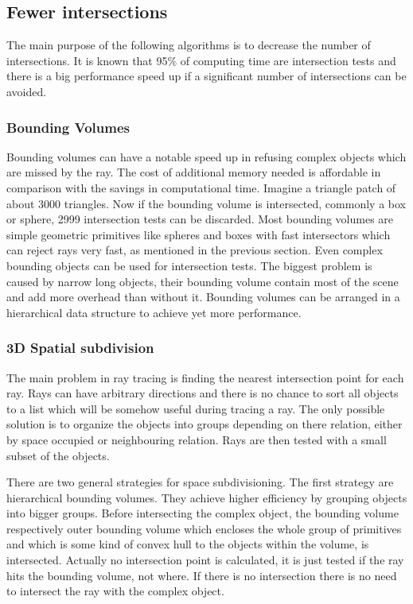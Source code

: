 \documentclass[DIV10, abstracton, openright, footsepline, headsepline, twoside, 9pt,
bigheadings]{scrreprt}
\begin{document}
\subsection{Fewer intersections}
The main purpose of the following algorithms is to decrease the number of
intersections. It is known that 95\% of computing time are intersection tests
and there is a big performance speed up if a significant number of intersections
can be avoided.
\subsubsection{Bounding Volumes}
Bounding volumes can have a notable speed up in refusing complex objects which
are missed by the ray. The cost of additional memory needed is affordable in
comparison with the savings in computational time. Imagine a triangle patch of
about 3000 triangles. Now if the bounding volume is intersected, commonly a box
or sphere, 2999 intersection tests can be discarded. Most bounding volumes are
simple geometric primitives like spheres and boxes with fast intersectors which
can reject rays very fast, as mentioned in the previous section. Even complex
bounding objects can be used for intersection tests. The biggest problem is
caused by narrow long objects, their bounding volume contain most of the scene
and add more overhead than without it. Bounding volumes can be arranged in a
hierarchical data structure to achieve yet more performance.
\subsubsection{3D Spatial subdivision}
The main problem in ray tracing is finding the nearest intersection
point for each ray. Rays can have arbitrary directions and there is no chance to
sort all objects to a list which will be somehow useful during tracing a ray.
The only possible solution is to organize the objects into groups depending on
there relation, either by space occupied or neighbouring relation. Rays are then
tested with a small subset of the objects.

There are two general strategies for space subdivisioning. The first strategy
are hierarchical bounding volumes. They achieve higher efficiency by grouping
objects into bigger groups. Before intersecting the complex object, the bounding
volume respectively outer bounding volume which encloses the whole group of
primitives and which is some kind of convex hull to the objects within the
volume, is intersected. Actually no intersection point is calculated, it is just
tested if the ray hits the bounding volume, not where. If there is no
intersection there is no need to intersect the ray with the complex object.
\end{document}
